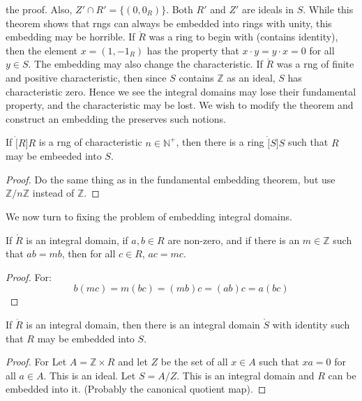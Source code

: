 \documentclass{book}                                                           %
\begin{document}
            the proof. Also, $Z'\cap{R}'=\{(0,0_{R})\}$. Both $R'$ and $Z'$
            are ideals in $S$. While this theorem shows that rngs can always
            be embedded into rings with unity, this embedding may be
            horrible. If $\ring{R}$ was a ring to begin with (contains
            identity), then the element $x=(1,\minus{1}_{R})$ has the
            property that $x\cdot{y}=y\cdot{x}=0$ for all $y\in{S}$. The
            embedding may also change the characteristic. If $\ring{R}$ was
            a rng of finite and positive characteristic, then since $S$
            contains $\mathbb{Z}$ as an ideal, $S$ has characteristic zero.
            Hence we see the integral domains may lose their fundamental
            property, and the characteristic may be lost. We wish to modify
            the theorem and construct an embedding the preserves such
            notions.
            \begin{theorem}
                If $\ring[R]{R}$ is a rng of characteristic
                $n\in\mathbb{N}^{+}$, then there is a ring $\ring[S]{S}$
                such that $R$ may be embeeded into $S$.
            \end{theorem}
            \begin{proof}
                Do the same thing as in the fundamental embedding theorem,
                but use $\mathbb{Z}/n\mathbb{Z}$ instead of $\mathbb{Z}$.
            \end{proof}
            We now turn to fixing the problem of embedding integral domains.
            \begin{theorem}
                If $\ring{R}$ is an integral domain, if $a,b\in{R}$ are
                non-zero, and if there is an $m\in\mathbb{Z}$ such that
                $ab=mb$, then for all $c\in{R}$, $ac=mc$.
            \end{theorem}
            \begin{proof}
                For:
                \begin{equation}
                    b(mc)=m(bc)=(mb)c=(ab)c=a(bc)
                \end{equation}
            \end{proof}
            \begin{theorem}
                If $\ring{R}$ is an integral domain, then there is an
                integral domain $\ring{S}$ with identity such that $R$
                may be embedded into $S$.
            \end{theorem}
            \begin{proof}
                For Let $A=\mathbb{Z}\times{R}$ and let $Z$ be the set of
                all $x\in{A}$ such that $xa=0$ for all $a\in{A}$. This is an
                ideal. Let $S=A/Z$. This is an integral domain and $R$ can
                be embedded into it. (Probably the canonical quotient map).
            \end{proof}
\end{document}
